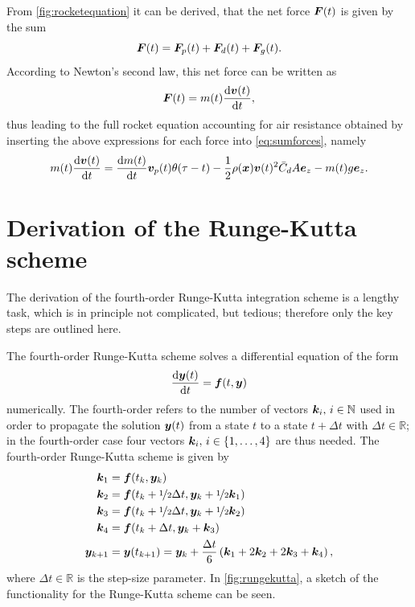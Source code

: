 \documentclass[a4paper,11pt]{report}
\begin{document}
From \cref{fig:rocketequation} it can be derived, that the net force $\bm{F}(t)$ is given by the sum \begin{equation}\label{eq:sumforces}
\bm{F}(t) = \bm{F}_p(t) + \bm{F}_d(t) + \bm{F}_g(t).
\end{equation} According to Newton's second law, this net force can be written as \begin{equation}
\bm{F}(t) = m(t)\frac{\mathrm{d}\bm{v}(t)}{\mathrm{d}t},
\end{equation} thus leading to the full rocket equation accounting for air resistance obtained by inserting the above expressions for each force into \cref{eq:sumforces}, namely \begin{equation}
m(t)\frac{\mathrm{d}\bm{v}(t)}{\mathrm{d}t} = \frac{\mathrm{d}m(t)}{\mathrm{d}t}\bm{v}_p(t)\theta(\tau-t) - \frac{1}{2}\rho(\bm{x})\bm{v}(t)^2\bar{C}_dA\bm{e}_z - m(t)g\bm{e}_z.
\end{equation}

\chapter{Derivation of the Runge-Kutta scheme}\label{sec:derivrungekutta}
The derivation of the fourth-order Runge-Kutta integration scheme is a lengthy task, which is in principle not complicated, but tedious; therefore only the key steps are outlined here.

The fourth-order Runge-Kutta scheme solves a differential equation of the form \begin{equation}
\frac{\mathrm{d}\bm{y}(t)}{\mathrm{d}t} = \bm{f}(t,\bm{y})
\end{equation} numerically. The fourth-order refers to the number of vectors $\bm{k}_i,\,i\in\mathbb{N}$ used in order to propagate the solution $\bm{y}(t)$ from a state $t$ to a state $t+\Delta t$ with $\Delta t\in\mathbb{R}$; in the fourth-order case four vectors $\bm{k}_i,\,i\in\{1,\dots,4\}$ are thus needed. The fourth-order Runge-Kutta scheme is given by \begin{align}
\begin{aligned}
\bm{k}_1 &= \bm{f}(t_k,\bm{y}_k) \\
\bm{k}_2 &= \bm{f}(t_k+\nicefrac{1}{2}\Delta t,\bm{y}_k+\nicefrac{1}{2}\bm{k}_1) \\
\bm{k}_3 &= \bm{f}(t_k + \nicefrac{1}{2}\Delta t,\bm{y}_k+\nicefrac{1}{2}\bm{k}_2) \\
\bm{k}_4 &= \bm{f}(t_k+\Delta t,\bm{y}_k+\bm{k}_3) \\
\bm{y}_{k+1} &= \bm{y}(t_{k+1}) = \bm{y}_k + \frac{\Delta t}{6}\left(\bm{k}_1 + 2\bm{k}_2 + 2\bm{k}_3 + \bm{k}_4\right),
\end{aligned}
\end{align}
where $\Delta t\in\mathbb{R}$ is the step-size parameter. In \cref{fig:rungekutta}, a sketch of the functionality for the Runge-Kutta scheme can be seen.
\end{document}
